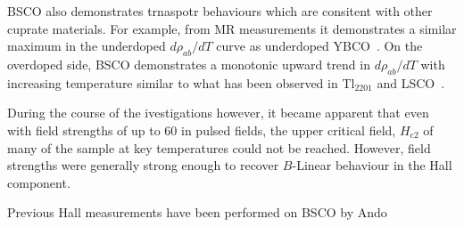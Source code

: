 \ac{BSCO} also demonstrates trnaspotr behaviours which are consitent with other \highTc cuprate materials. For example, from \ac{MR} measurements it demonstrates a similar maximum in the underdoped $d\rho_{ab}/dT$ curve as underdoped YBCO~\cite{Ando1999}. On the overdoped side, \ac{BSCO} demonstrates a monotonic upward trend in $d\rho_{ab}/dT$ with increasing temperature similar to what has been observed in Tl$_{2201}$ and \ac{LSCO}~\cite{Ando1999}.

During the course of the ivestigations however, it became apparent that even with field strengths of up to \unit{60}{\tesla} in pulsed fields, the upper critical field, $H_{\textrm{c2}}$ of many of the sample at key temperatures could not be reached. However, field strengths were generally strong enough to recover $B$-Linear behaviour in the Hall component.

Previous Hall measurements have been performed on \ac{BSCO} by Ando \etal {}




